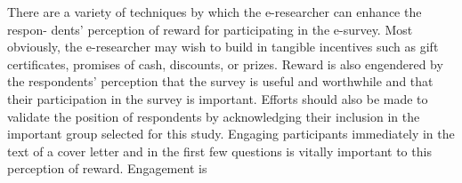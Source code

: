 \documentclass [10pt,a4paper]{book}
\begin{document}
There are a variety of techniques by which the e-researcher can enhance the respon-
dents’ perception of reward for participating in the e-survey. Most obviously, the
e-researcher may wish to build in tangible incentives such as gift certificates,
promises of cash, discounts, or prizes. Reward is also engendered by the respondents’
perception that the survey is useful and worthwhile and that their participation in
the survey is important. Efforts should also be made to validate the position of
respondents by acknowledging their inclusion in the important group selected for
this study. Engaging participants immediately in the text of a cover letter and in the
first few questions is vitally important to this perception of reward. Engagement is
\end{document}
